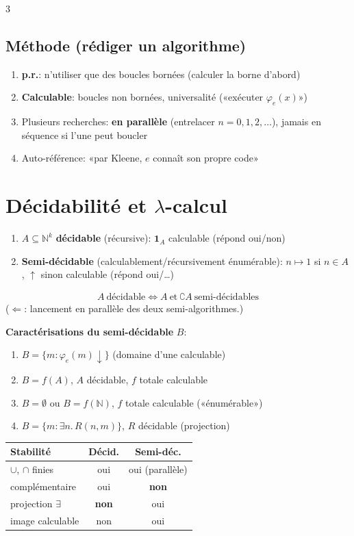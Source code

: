 \documentclass[12pt, a4paper]{article}
\newcommand{\cN}{\mathbb{N}}
\newcommand{\dv}{{\downarrow}}
\newcommand{\uv}{{\uparrow}}
\newcommand{\ff}{\varphi}
\providecommand{\ind}{\mathbf{1}}
\begin{document}
\begin{multicols*}{3}
	\subsection{Méthode (rédiger un algorithme)}
	\begin{enumerate}[\roman*.]
		\item \textbf{p.r.}: n'utiliser que des boucles bornées (calculer la borne d'abord)
		\item \textbf{Calculable}: boucles non bornées, universalité («exécuter $\ff_e(x)$»)
		\item Plusieurs recherches: \textbf{en parallèle} (entrelacer $n=0,1,2,\dots$), jamais en séquence si l'une peut boucler
		\item Auto-référence: «par Kleene, $e$ connaît son propre code»
	\end{enumerate}

	\colbreak
	\section{Décidabilité et $\lambda$-calcul}
	\begin{enumerate}[\roman*.]
		\item $A\subseteq\cN^k$ \textbf{décidable} (récursive): $\ind_A$ calculable (répond oui/non)
		\item \textbf{Semi-décidable} (calculablement/récursivement énumérable): $n\mapsto1$ si $n\in A$, $\uv$ sinon calculable (répond oui/…)
	\end{enumerate}
	\begin{gather*}
		A\ \text{décidable}\iff A\ \text{et}\ \complement A\ \text{semi-décidables}
	\end{gather*}
	($\Leftarrow$: lancement en parallèle des deux semi-algorithmes.)

	\textbf{Caractérisations du semi-décidable} $B$:
	\begin{enumerate}[\roman*.]
		\item $B=\{m:\ff_e(m)\dv\}$ (domaine d'une calculable)
		\item $B=f(A)$, $A$ décidable, $f$ totale calculable
		\item $B=\emptyset$ ou $B=f(\cN)$, $f$ totale calculable («énumérable»)
		\item $B=\{m:\exists n.\,R(n,m)\}$, $R$ décidable (projection)
	\end{enumerate}

	\begin{tabular}{|l|c|c|}
		\hline
		\textbf{Stabilité}  & \textbf{Décid.} & \textbf{Semi-déc.} \\
		\hline
		$\cup$, $\cap$ finies & oui            & oui (parallèle)    \\
		complémentaire        & oui            & \textbf{non}       \\
		projection $\exists$  & \textbf{non}   & oui                \\
		image calculable      & non            & oui                \\
		\hline
	\end{tabular}


\end{multicols*}
\end{document}
